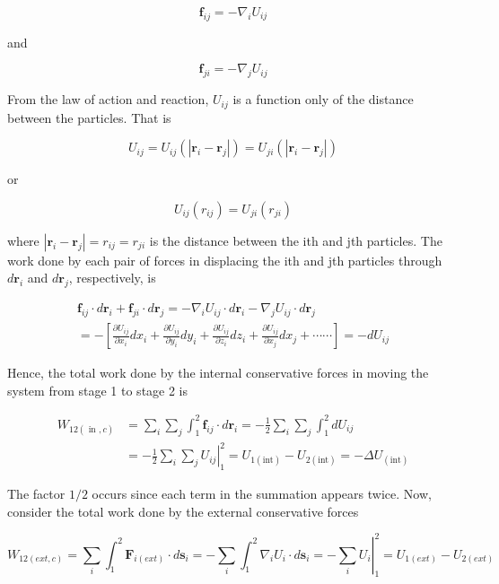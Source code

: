 \documentclass[10pt]{article}
\begin{document}
$$
\mathbf{f}_{i j}=-\nabla_{i} U_{i j}
$$

and

$$
\mathbf{f}_{j i}=-\nabla_{j} U_{i j}
$$

From the law of action and reaction, $U_{i j}$ is a function only of the distance between the particles. That is

$$
U_{i j}=U_{i j}\left(\left|\mathbf{r}_{i}-\mathbf{r}_{j}\right|\right)=U_{j i}\left(\left|\mathbf{r}_{i}-\mathbf{r}_{j}\right|\right)
$$

or

$$
U_{i j}\left(r_{i j}\right)=U_{j i}\left(r_{j i}\right)
$$

where $\left|\mathbf{r}_{i}-\mathbf{r}_{j}\right|=r_{i j}=r_{j i}$ is the distance between the ith and jth particles. The work done by each pair of forces in displacing the ith and jth particles through $d \mathbf{r}_{i}$ and $d \mathbf{r}_{j}$, respectively, is

$$
\begin{gathered}
\mathbf{f}_{i j} \cdot d \mathbf{r}_{i}+\mathbf{f}_{j i} \cdot d \mathbf{r}_{j}=-\nabla_{i} U_{i j} \cdot d \mathbf{r}_{i}-\nabla_{j} U_{i j} \cdot d \mathbf{r}_{j} \\
=-\left[\frac{\partial U_{i j}}{\partial x_{i}} d x_{i}+\frac{\partial U_{i j}}{\partial y_{i}} d y_{i}+\frac{\partial U_{i j}}{\partial z_{i}} d z_{i}+\frac{\partial U_{i j}}{\partial x_{j}} d x_{j}+\cdots \cdots\right]=-d U_{i j}
\end{gathered}
$$

Hence, the total work done by the internal conservative forces in moving the system from stage 1 to stage 2 is

$$
\begin{aligned}
W_{12(\text { in }, c)} & =\sum_{i} \sum_{j} \int_{1}^{2} \mathbf{f}_{i j} \cdot d \mathbf{r}_{i}=-\frac{1}{2} \sum_{i} \sum_{j} \int_{1}^{2} d U_{i j} \\
& =-\left.\frac{1}{2} \sum_{i} \sum_{j} U_{i j}\right|_{1} ^{2}=U_{1(\mathrm{int})}-U_{2(\mathrm{int})}=-\Delta U_{(\mathrm{int})}
\end{aligned}
$$

The factor $1 / 2$ occurs since each term in the summation appears twice. Now, consider the total work done by the external conservative forces

$$
W_{12(e x t, c)}=\sum_{i} \int_{1}^{2} \mathbf{F}_{i(e x t)} \cdot d \mathbf{s}_{i}=-\sum_{i} \int_{1}^{2} \nabla_{i} U_{i} \cdot d \mathbf{s}_{i}=-\left.\sum_{i} U_{i}\right|_{1} ^{2}=U_{1(e x t)}-U_{2(e x t)}
$$
\end{document}
